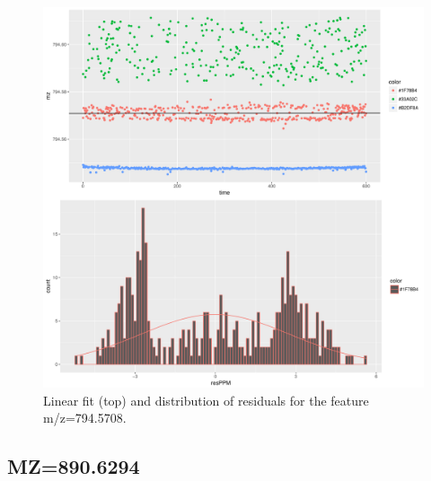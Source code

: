 \documentclass[]{article}
\begin{document}
\begin{figure}[H]
\begin{center}
\includegraphics{Supplementary_document_files/figure-latex/filter.lm.794-1.pdf}
\caption{Linear fit (top) and distribution of residuals for the  feature m/z=794.5708.}
\label{ig:chk.mz.794.5708}
\end{center}
\end{figure}


\subsection{MZ=890.6294}\label{mz890.6294}
\end{document}
